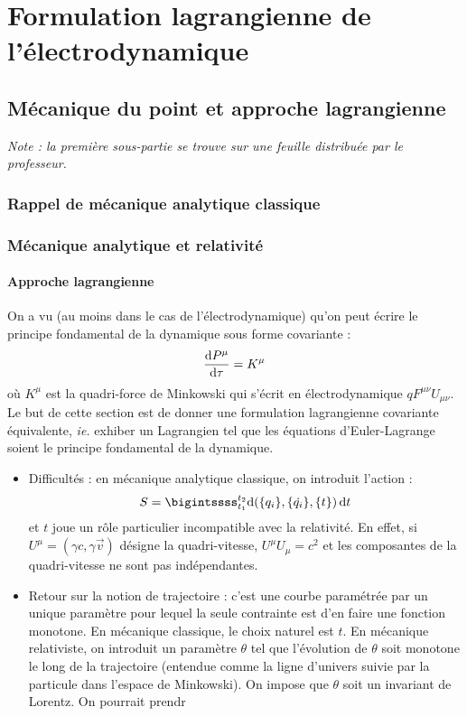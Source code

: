 \chapter{Formulation lagrangienne de l'électrodynamique}

\section{Mécanique du point et approche lagrangienne}
{\small \it Note : la première sous-partie se trouve sur une feuille distribuée par le professeur.}
\subsection{Rappel de mécanique analytique classique}
\subsection{Mécanique analytique et relativité}
\subsubsection{Approche lagrangienne}

On a vu (au moins dans le cas de l'électrodynamique) qu'on peut écrire le principe fondamental de la dynamique sous forme covariante :
$$
	\frac{\mathrm{d} P^\mu}{\mathrm{d} \tau}=K^\mu
$$
où $K^\mu$ est la quadri-force de Minkowski qui s'écrit en électrodynamique $qF^{\mu\nu}U_{\mu\nu}$. Le but de cette section est de donner une formulation lagrangienne covariante équivalente, \emph{ie.} exhiber un Lagrangien tel que les équations d'Euler-Lagrange soient le principe fondamental de la dynamique.
\begin{itemize}
	\item Difficultés : en mécanique analytique classique, on introduit l'action :
	$$
		S=\bigintssss_{t_1}^{t_2}\dif (\{q_i\},\{\dot{q_i}\},\{t\})\,\dif t
	$$
	et $t$ joue un rôle particulier incompatible avec la relativité. En effet, si $U^\mu=(\gamma c,\gamma \vec{v})$ désigne la quadri-vitesse, $U^\mu U_\mu = c^2$ et les composantes de la quadri-vitesse ne sont pas indépendantes.
	
	\item Retour sur la notion de trajectoire : c'est une courbe paramétrée par un unique paramètre pour lequel la seule contrainte est d'en faire une fonction monotone. En mécanique classique, le choix naturel est $t$. En mécanique relativiste, on introduit un paramètre $\theta$ tel que l'évolution de $\theta$ soit monotone le long de la trajectoire (entendue comme la ligne d'univers suivie par la particule dans l'espace de Minkowski). On impose que $\theta$ soit un invariant de Lorentz. On pourrait prendr
\end{itemize}